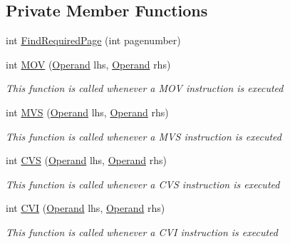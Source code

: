 \subsection*{Private Member Functions}
\begin{DoxyCompactItemize}
\item 
int \hyperlink{class_c_p_u___o_s___simulator_1_1_c_p_u_1_1_instruction_ae0e0e21063eeb9aa0dc0896e6e4c71dc}{Find\+Required\+Page} (int pagenumber)
\item 
int \hyperlink{class_c_p_u___o_s___simulator_1_1_c_p_u_1_1_instruction_af6548da603e7370f10de03e0da040a24}{M\+O\+V} (\hyperlink{class_c_p_u___o_s___simulator_1_1_c_p_u_1_1_operand}{Operand} lhs, \hyperlink{class_c_p_u___o_s___simulator_1_1_c_p_u_1_1_operand}{Operand} rhs)
\begin{DoxyCompactList}\small\item\em This function is called whenever a M\+O\+V instruction is executed \end{DoxyCompactList}\item 
int \hyperlink{class_c_p_u___o_s___simulator_1_1_c_p_u_1_1_instruction_a33723518d4e117877d2ecf5b861d2eb2}{M\+V\+S} (\hyperlink{class_c_p_u___o_s___simulator_1_1_c_p_u_1_1_operand}{Operand} lhs, \hyperlink{class_c_p_u___o_s___simulator_1_1_c_p_u_1_1_operand}{Operand} rhs)
\begin{DoxyCompactList}\small\item\em This function is called whenever a M\+V\+S instruction is executed \end{DoxyCompactList}\item 
int \hyperlink{class_c_p_u___o_s___simulator_1_1_c_p_u_1_1_instruction_a689065741dc51ddacf955b3781570546}{C\+V\+S} (\hyperlink{class_c_p_u___o_s___simulator_1_1_c_p_u_1_1_operand}{Operand} lhs, \hyperlink{class_c_p_u___o_s___simulator_1_1_c_p_u_1_1_operand}{Operand} rhs)
\begin{DoxyCompactList}\small\item\em This function is called whenever a C\+V\+S instruction is executed \end{DoxyCompactList}\item 
int \hyperlink{class_c_p_u___o_s___simulator_1_1_c_p_u_1_1_instruction_af73e92c10474c39863df39c1f826ff50}{C\+V\+I} (\hyperlink{class_c_p_u___o_s___simulator_1_1_c_p_u_1_1_operand}{Operand} lhs, \hyperlink{class_c_p_u___o_s___simulator_1_1_c_p_u_1_1_operand}{Operand} rhs)
\begin{DoxyCompactList}\small\item\em This function is called whenever a C\+V\+I instruction is executed \end{DoxyCompactList}\item 

\end{DoxyCompactItemize}
